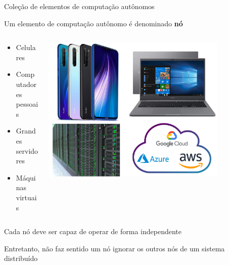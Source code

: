 \documentclass[compress]{beamer}
\begin{document}
\begin{frame}{Coleção de elementos de computação autônomos}

Um elemento de computação autônomo é denominado \textbf{nó}
\begin{columns}[T] %
\begin{column}{.40\textwidth}
\begin{itemize}
    \item Celulares
    \item Computadores pessoais
    \item Grandes servidores
    \item Máquinas virtuais
\end{itemize}
\end{column}
\begin{column}{.50\textwidth}
\centering\includegraphics[width=0.8\textwidth]{images/elementos_sd.png}
\end{column}
\end{columns}

\vspace{0.5cm}

Cada nó deve ser capaz de operar de forma independente

\vspace{0.5cm}

Entretanto, não faz sentido um nó ignorar os outros nós de um sistema distribuído

\end{frame}

\end{document}
